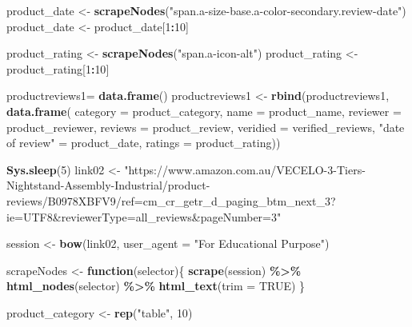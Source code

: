 \documentclass[
]{article}
\newenvironment{Shaded}{\begin{snugshade}}{\end{snugshade}}
\newcommand{\AttributeTok}[1]{\textcolor[rgb]{0.13,0.29,0.53}{#1}}
\newcommand{\ConstantTok}[1]{\textcolor[rgb]{0.56,0.35,0.01}{#1}}
\newcommand{\ControlFlowTok}[1]{\textcolor[rgb]{0.13,0.29,0.53}{\textbf{#1}}}
\newcommand{\DecValTok}[1]{\textcolor[rgb]{0.00,0.00,0.81}{#1}}
\newcommand{\FunctionTok}[1]{\textcolor[rgb]{0.13,0.29,0.53}{\textbf{#1}}}
\newcommand{\NormalTok}[1]{#1}
\newcommand{\OtherTok}[1]{\textcolor[rgb]{0.56,0.35,0.01}{#1}}
\newcommand{\SpecialCharTok}[1]{\textcolor[rgb]{0.81,0.36,0.00}{\textbf{#1}}}
\newcommand{\StringTok}[1]{\textcolor[rgb]{0.31,0.60,0.02}{#1}}
\begin{document}
\begin{Shaded}
\begin{Highlighting}[]
\NormalTok{  product\_date }\OtherTok{\textless{}{-}} \FunctionTok{scrapeNodes}\NormalTok{(}\StringTok{"span.a{-}size{-}base.a{-}color{-}secondary.review{-}date"}\NormalTok{)}
\NormalTok{  product\_date }\OtherTok{\textless{}{-}}\NormalTok{ product\_date[}\DecValTok{1}\SpecialCharTok{:}\DecValTok{10}\NormalTok{]}
  
\NormalTok{  product\_rating }\OtherTok{\textless{}{-}} \FunctionTok{scrapeNodes}\NormalTok{(}\StringTok{"span.a{-}icon{-}alt"}\NormalTok{)}
\NormalTok{  product\_rating }\OtherTok{\textless{}{-}}\NormalTok{ product\_rating[}\DecValTok{1}\SpecialCharTok{:}\DecValTok{10}\NormalTok{]}
  
\NormalTok{  productreviews1}\OtherTok{=} \FunctionTok{data.frame}\NormalTok{()}
\NormalTok{  productreviews1 }\OtherTok{\textless{}{-}} \FunctionTok{rbind}\NormalTok{(productreviews1, }\FunctionTok{data.frame}\NormalTok{(}
                      \AttributeTok{category =}\NormalTok{ product\_category,}
                      \AttributeTok{name =}\NormalTok{ product\_name,}
                      \AttributeTok{reviewer =}\NormalTok{ product\_reviewer,}
                      \AttributeTok{reviews =}\NormalTok{ product\_review,}
                      \AttributeTok{veridied =}\NormalTok{ verified\_reviews,}
                      \StringTok{"date of review"} \OtherTok{=}\NormalTok{ product\_date,}
                      \AttributeTok{ratings =}\NormalTok{ product\_rating))}

  
 \FunctionTok{Sys.sleep}\NormalTok{(}\DecValTok{5}\NormalTok{)}
\NormalTok{link02 }\OtherTok{\textless{}{-}} \StringTok{"https://www.amazon.com.au/VECELO{-}3{-}Tiers{-}Nightstand{-}Assembly{-}Industrial/product{-}reviews/B0978XBFV9/ref=cm\_cr\_getr\_d\_paging\_btm\_next\_3?ie=UTF8\&reviewerType=all\_reviews\&pageNumber=3"}


\NormalTok{  session }\OtherTok{\textless{}{-}} \FunctionTok{bow}\NormalTok{(link02,}
               \AttributeTok{user\_agent =} \StringTok{"For Educational Purpose"}\NormalTok{)}

\NormalTok{  scrapeNodes }\OtherTok{\textless{}{-}} \ControlFlowTok{function}\NormalTok{(selector)\{}
    \FunctionTok{scrape}\NormalTok{(session) }\SpecialCharTok{\%\textgreater{}\%}
      \FunctionTok{html\_nodes}\NormalTok{(selector) }\SpecialCharTok{\%\textgreater{}\%}
      \FunctionTok{html\_text}\NormalTok{(}\AttributeTok{trim =} \ConstantTok{TRUE}\NormalTok{)}
\NormalTok{  \}}

\NormalTok{  product\_category }\OtherTok{\textless{}{-}} \FunctionTok{rep}\NormalTok{(}\StringTok{"table"}\NormalTok{, }\DecValTok{10}\NormalTok{)}


\end{Highlighting}
\end{Shaded}
\end{document}
